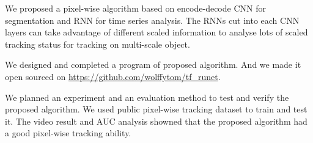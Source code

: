 \begin{eabstract}
	\par
	We proposed a pixel-wise algorithm based on encode-decode CNN for segmentation and RNN for time series analysis. The RNNs cut into each CNN layers can take advantage of different scaled information to analyse lots of scaled tracking status for tracking on multi-scale object.
	\par
	We designed and completed a program of proposed algorithm. And we made it open sourced on \url{https://github.com/wolffytom/tf_runet}.
	\par
	We planned an experiment and an evaluation method to test and verify the proposed algorithm. We used public pixel-wise tracking dataset to train and test it. The video result and AUC analysis showned that the proposed algorithm had a good pixel-wise tracking ability.
\end{eabstract}

